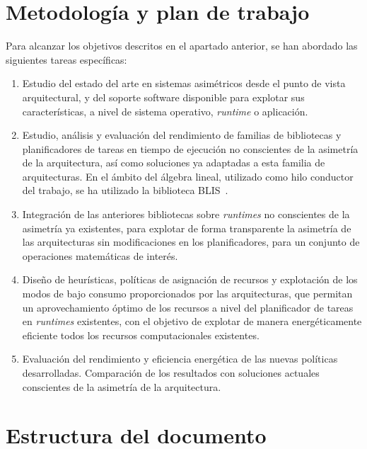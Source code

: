 \section{Metodología y plan de trabajo}
Para alcanzar los objetivos descritos en el apartado anterior, se han
abordado las siguientes tareas específicas:
\begin{enumerate}[T1.]
\item Estudio del estado del arte en sistemas asimétricos desde el punto de
  vista arquitectural, y del soporte software disponible para explotar sus
  características, a nivel de sistema operativo, \emph{runtime} o
  aplicación.
\item Estudio, análisis y evaluación del rendimiento de familias de
  bibliotecas y planificadores de tareas en tiempo de ejecución no
  conscientes de la asimetría de la arquitectura, así como soluciones ya
  adaptadas a esta familia de arquitecturas. En el ámbito del álgebra
  lineal, utilizado como hilo conductor del trabajo, se ha utilizado la
  biblioteca BLIS~\cite{BLIS1}.
\item Integración de las anteriores bibliotecas sobre \emph{runtimes} no
  conscientes de la asimetría ya existentes, para explotar de forma
  transparente la asimetría de las arquitecturas sin modificaciones en los
  planificadores, para un conjunto de operaciones matemáticas de interés.
\item Diseño de heurísticas, políticas de asignación de recursos y
  explotación de los modos de bajo consumo proporcionados por las
  arquitecturas, que permitan un aprovechamiento óptimo de los recursos a
  nivel del planificador de tareas en \emph{runtimes} existentes, con el
  objetivo de explotar de manera energéticamente eficiente todos los
  recursos computacionales existentes.
\item Evaluación del rendimiento y eficiencia energética de las nuevas
  políticas desarrolladas. Comparación de los resultados con soluciones
  actuales conscientes de la asimetría de la arquitectura.
\end{enumerate}

\section{Estructura del documento}

